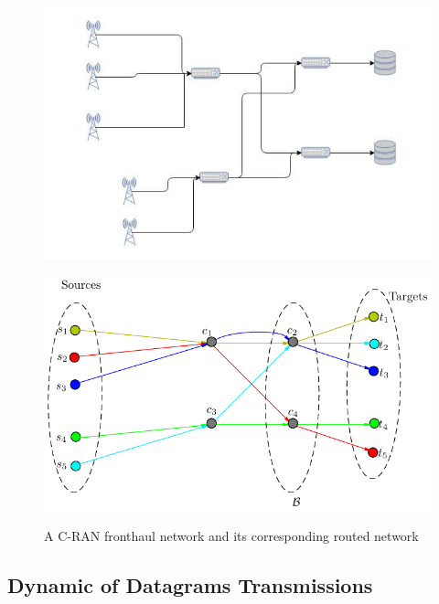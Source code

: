 \documentclass[a4paper,10pt]{article}
\begin{document}
\begin{figure}

\begin{minipage}[c]{.45\linewidth}
	
	
	\includegraphics[scale=0.5]{fronthaul}



	 \end{minipage} 
 \hfill
 \begin{minipage}[c]{.45\linewidth}
	
	
	\includegraphics[scale=0.5]{graphmodel}\\

	 \end{minipage}
	 
\caption{A C-RAN fronthaul network and its corresponding routed network}
\label{fig:fronthaul}
\end{figure} 


	 
	 
 	\subsection{Dynamic of Datagrams Transmissions}
	    
\end{document}
